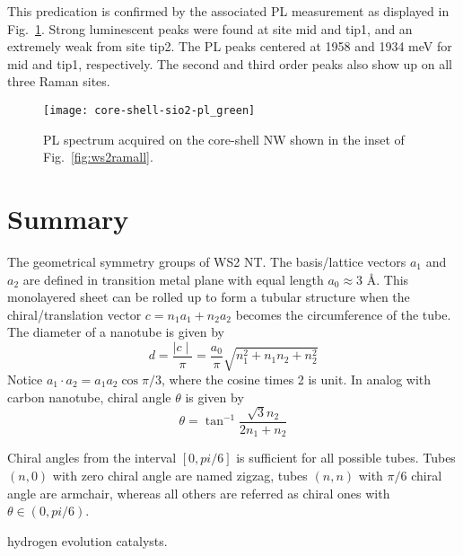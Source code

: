 This predication is confirmed by the associated PL measurement as displayed in Fig.~\ref{fig:ws2plgreen}. Strong luminescent peaks were found at site mid and tip1, and an extremely weak from site tip2. The PL peaks centered at 1958 and 1934 meV for mid and tip1, respectively. The second and third order peaks also show up on all three Raman sites. 

\begin{figure}[htb]
\centering
\texttt{[image: core-shell-sio2-pl\_green]}
\caption[PL spectra of - on -Si]{PL spectrum acquired on the core-shell NW shown in the inset of Fig.~\ref{fig:ws2ramall}.}
\label{fig:ws2plgreen}
\end{figure}

\section{Summary} 

\iffalse


The geometrical symmetry groups of WS2 NT.\cite{Milosevic2000} 
The basis/lattice vectors $a_1$ and $a_2$ are defined in transition metal plane with equal length $a_0 \approx 3$ \AA. This monolayered sheet can be rolled up to form a tubular structure when the chiral/translation vector $c = n_1a_1 + n_2a_2$ becomes the circumference of the tube. The diameter of a nanotube is given by 
\begin{equation}
d = \frac{\mid c \mid}{\pi} = \frac{a_0}{\pi}\sqrt{n_1^2 + n_1n_2 + n_2^2}
\end{equation}
Notice $a_1 \cdot a_2 = a_1a_2 \cos\pi/3$, where the cosine times 2 is unit. 
In analog with carbon nanotube, chiral angle $\theta$ is given by
\begin{equation}
\theta = \tan^{-1}\frac{\sqrt{3}n_2}{2n_1 + n_2}
\end{equation}

Chiral angles from the interval $[0,pi/6]$ is sufficient for all possible tubes. Tubes $(n,0)$ with zero chiral angle are named zigzag, tubes $(n,n)$ with $\pi/6$ chiral angle are armchair, whereas all others are referred as chiral ones with $\theta \in (0,pi/6)$. 



hydrogen evolution catalysts. \cite{Merki2011}

